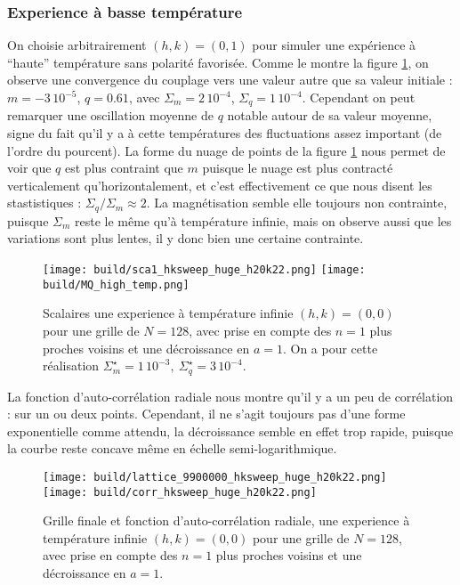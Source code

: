 \documentclass[a4paper, 11pt]{article}
\begin{document}
\subsubsection{Experience à basse température}

On choisie arbitrairement $(h, k) = (0, 1)$ pour simuler une expérience à ``haute'' température sans
polarité favorisée. Comme le montre la figure \ref{fig:high_en_sca}, on observe une convergence du
couplage vers une valeur autre que sa valeur initiale : $m = -3\,10^{-5}$, $q=0.61$, avec $\Sigma_m
= 2\,10^{-4}$, $\Sigma_q = 1\,10^{-4}$. Cependant on peut remarquer une oscillation moyenne de $q$
notable autour de sa valeur moyenne, signe du fait qu'il y a à cette températures des fluctuations
assez important (de l'ordre du pourcent). La forme du nuage de points de la figure
\ref{fig:high_en_sca} nous permet de voir que $q$ est plus contraint que $m$ puisque le nuage est
plus contracté verticalement qu'horizontalement, et c'est effectivement ce que nous disent les
stastistiques : $\Sigma_q/ \Sigma_m \approx 2$. La magnétisation semble elle toujours non
contrainte, puisque $\Sigma_m$ reste le même qu'à température infinie, mais on observe aussi que les
variations sont plus lentes, il y donc bien une certaine contrainte. 


\begin{figure}
    \centering
    \texttt{[image: build/sca1\_hksweep\_huge\_h20k22.png]}
    \texttt{[image: build/MQ\_high\_temp.png]}
    \caption{Scalaires une experience à température infinie $(h, k) = (0, 0)$ pour une grille de
    $N=128$, avec prise en compte des $n=1$ plus proches voisins et une décroissance en $a=1$. On a
    pour cette réalisation $\Sigma_m^\star = 1\,10^{-3},~ \Sigma_q^\star = 3\,10^{-4}$.}
    \label{fig:high_en_sca}
\end{figure}


La fonction d'auto-corrélation radiale nous montre qu'il y a un peu de corrélation : sur un ou deux
points. Cependant, il ne s'agit toujours pas d'une forme exponentielle comme attendu, la
décroissance semble en effet trop rapide, puisque la courbe reste concave même en échelle
semi-logarithmique. 

\begin{figure}
    \centering
    \texttt{[image: build/lattice\_9900000\_hksweep\_huge\_h20k22.png]}
    \texttt{[image: build/corr\_hksweep\_huge\_h20k22.png]}
    \caption{Grille finale et fonction d'auto-corrélation radiale, une experience à température
    infinie $(h, k) = (0, 0)$ pour une grille de $N=128$, avec prise en compte des $n=1$ plus
    proches voisins et une décroissance en $a=1$.} 
    \label{fig:high_en_corr}
\end{figure}






\end{document}
